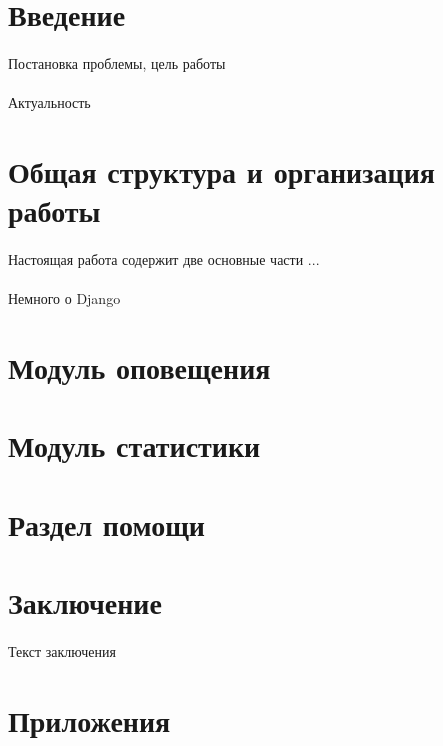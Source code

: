 \documentclass[12pt, a4paper, oneside]{article}
\begin{document}
\tableofcontents
\newpage

\section{Введение}
\paragraph{} %
Постановка проблемы, цель работы
\paragraph{} %
Актуальность
\newpage

\section{Общая структура и организация работы}
\paragraph{}
Настоящая работа содержит две основные части ...
\paragraph{}
Немного о Django
\newpage

\section{Модуль оповещения}
\newpage

\section{Модуль статистики}
\newpage

\section{Раздел помощи}
\newpage

\section{Заключение}
\paragraph{}
Текст заключения
\newpage

\section{Приложения}
\newpage
\end{document}
